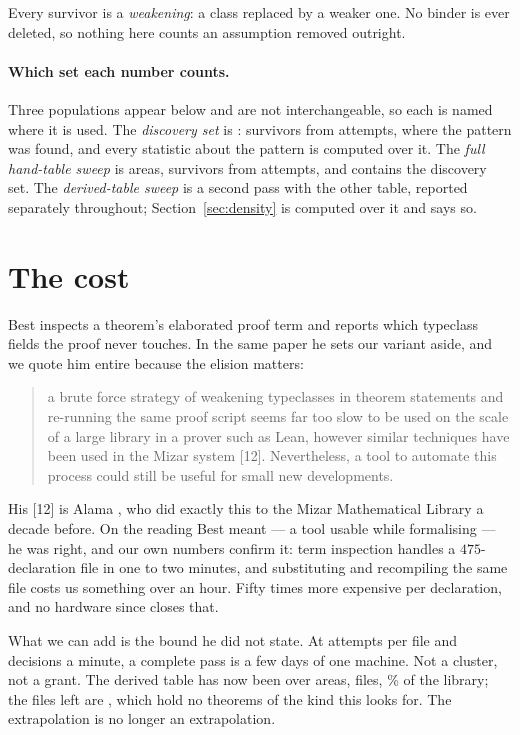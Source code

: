 \documentclass[11pt]{article}
\begin{document}
Every survivor is a \emph{weakening}: a class replaced by a weaker one. No
binder is ever deleted, so nothing here counts an assumption removed outright.

\paragraph{Which set each number counts.} Three populations appear below and are
not interchangeable, so each is named where it is used. The \emph{discovery set}
is \areaNames{}: \survivors{} survivors from \attempts{} attempts, where the
pattern was found, and every statistic about the pattern is computed over it.
The \emph{full hand-table sweep} is \allAreasWord{} areas, \allSurvivors{}
survivors from \allAttempts{} attempts, and contains the discovery set. The
\emph{derived-table sweep} is a second pass with the other table, reported
separately throughout; Section~\ref{sec:density} is computed over it and says
so.

\section{The cost}\label{sec:cost}

Best \cite{best2021} inspects a theorem's elaborated proof term and reports
which typeclass fields the proof never touches. In the same paper he sets our
variant aside, and we quote him entire because the elision matters:

\begin{quote}
a brute force strategy of weakening typeclasses in theorem statements and
re-running the same proof script seems far too slow to be used on the scale of a
large library in a prover such as Lean, however similar techniques have been
used in the Mizar system [12]. Nevertheless, a tool to automate this process
could still be useful for small new developments.
\end{quote}

His [12] is Alama \cite{alama2013}, who did exactly this to the Mizar
Mathematical Library a decade before. On the reading Best meant --- a tool
usable while formalising --- he was right, and our own numbers confirm it: term
inspection handles a $475$-declaration file in one to two minutes, and
substituting and recompiling the same file costs us something over an hour.
Fifty times more expensive per declaration, and no hardware since closes that.

What we can add is the bound he did not state. At
\allAttemptsPerFile{} attempts per file and \decisionsPerMinute{} decisions a
minute, a complete pass is a few days of one machine. Not a cluster, not a
grant. The derived table has now been over \derivedAreas{} areas,
\derivedSweptFiles{} files, \derivedSweptPercent{}\% of the library; the
\unsweptFiles{} files left are \unsweptAreas{}, which hold no theorems of the
kind this looks for. The extrapolation is no longer an extrapolation.
\end{document}
